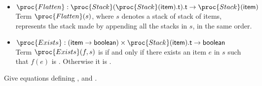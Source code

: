 \begin{itemize}
\begin{itemize}
      \item \(\proc{Flatten} :
        \proc{Stack}(\proc{Stack}(\type{item}).\type{t}).\type{t}
        \rightarrow \proc{Stack}(\type{item})\)\\ Term
        \(\proc{Flatten} (s)\), where \(s\) denotes a stack of
        stack of items, represents the stack made by appending all the
        stacks in \(s\), in the same order.

     \item \(\proc{Exists} : (\type{item} \rightarrow \type{boolean})
       \times \proc{Stack}(\type{item}).\type{t} \rightarrow
       \type{boolean}\)\\ Term \(\proc{Exists} (f, s)\) is
        if and only if there exists an item \(e\) in \(s\)
       such that \(f(e)\) is . Otherwise it is
       .

    \end{itemize}
    
  \end{itemize}

  Give equations defining ,  and .
